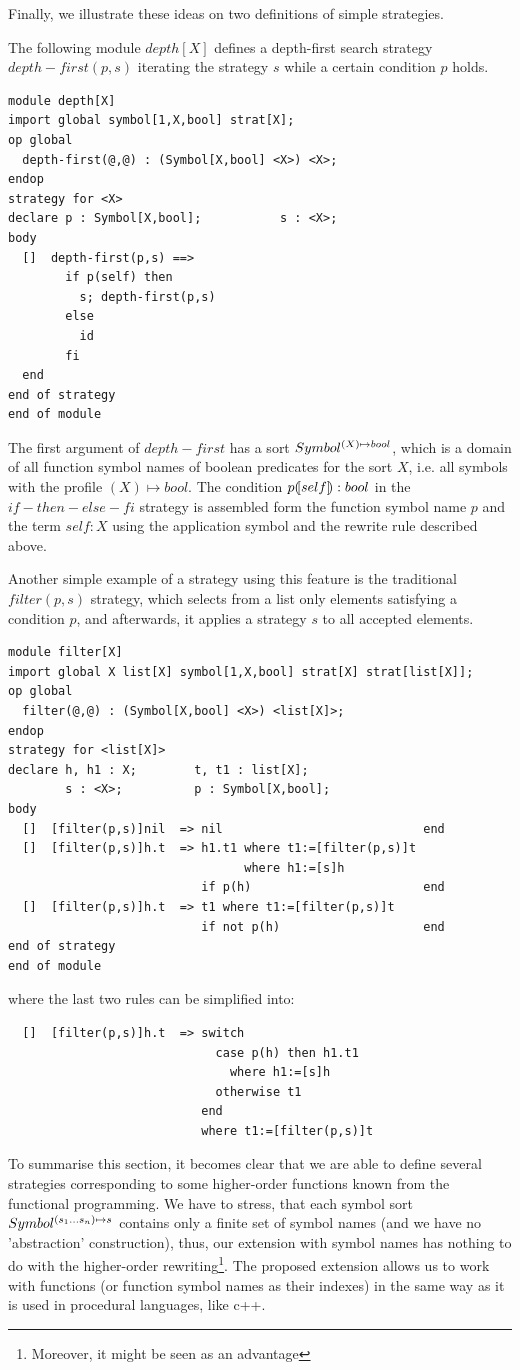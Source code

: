 \documentclass{article}
\begin{document}
{Finally, we illustrate these ideas on two definitions of simple strategies.

\noindent
The following module $depth[X]$ defines a depth-first search 
strategy $depth-first(p,s)$ iterating
the strategy $s$ while a certain condition $p$ holds.
%
{\small
\begin{verbatim}
module depth[X]
import global symbol[1,X,bool] strat[X];
op global
  depth-first(@,@) : (Symbol[X,bool] <X>) <X>;
endop
strategy for <X>
declare p : Symbol[X,bool];           s : <X>;
body
  []  depth-first(p,s) ==>
        if p(self) then
          s; depth-first(p,s)
        else
          id
        fi
  end
end of strategy
end of module
\end{verbatim}}\noindent
%
The first argument of $depth-first$ has a sort $Symbol^{(X)\mapsto bool}$,
which is a domain of all function symbol names of boolean predicates 
for the sort $X$, i.e. all symbols with the profile $(X) \mapsto bool$.
The condition $p ( {\kern -2pt} [ self ] {\kern -2pt} ) :bool$ in the 
$if-then-else-fi$ strategy is assembled form 
the function symbol name $p$ and the term
$self:X$ using the application symbol and the rewrite rule
described above.

Another simple example of a strategy using this feature is the traditional  
$filter(p,s)$ strategy, which selects from a list only elements
satisfying a condition $p$, and afterwards, it applies a strategy $s$
to all accepted elements.
{\small
\begin{verbatim}
module filter[X]
import global X list[X] symbol[1,X,bool] strat[X] strat[list[X]];
op global
  filter(@,@) : (Symbol[X,bool] <X>) <list[X]>;
endop
strategy for <list[X]>
declare h, h1 : X;        t, t1 : list[X]; 
        s : <X>;          p : Symbol[X,bool];
body
  []  [filter(p,s)]nil  => nil                            end
  []  [filter(p,s)]h.t  => h1.t1 where t1:=[filter(p,s)]t
                                 where h1:=[s]h
                           if p(h)                        end
  []  [filter(p,s)]h.t  => t1 where t1:=[filter(p,s)]t
                           if not p(h)                    end
end of strategy
end of module
\end{verbatim}}\noindent
%
where the last two rules can be simplified into:
{\small
\begin{verbatim}
  []  [filter(p,s)]h.t  => switch
                             case p(h) then h1.t1
                               where h1:=[s]h
                             otherwise t1
                           end
                           where t1:=[filter(p,s)]t
\end{verbatim}}\noindent
To summarise this section, it becomes clear that we are able to
define several strategies corresponding to some higher-order
functions known from the functional programming. 
We have to stress, that each
symbol sort $Symbol^{(s_1 \ldots s_n) \mapsto s}$ contains only a finite
set of symbol names (and we have no 'abstraction' construction), thus,
our extension with symbol names has nothing to do with the higher-order
rewriting\footnote{Moreover, it might be seen as an advantage}.
The proposed extension allows us to work with functions
(or function symbol names as their indexes) in the same way as it is
used in procedural languages, like c++.
}
\end{document}
